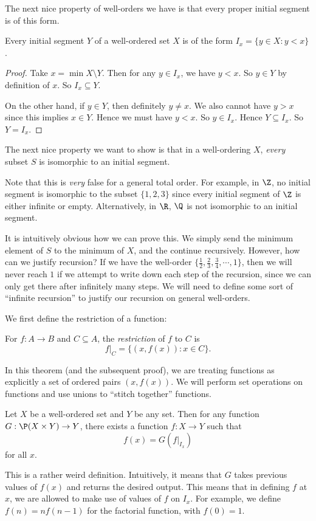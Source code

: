 \documentclass[a4paper]{article}
\begin{document}
The next nice property of well-orders we have is that every proper initial segment is of this form.
\begin{prop}
  Every initial segment $Y$ of a well-ordered set $X$ is of the form $I_x = \{y\in X: y < x\}$.
\end{prop}

\begin{proof}
  Take $x = \min X\setminus Y$. Then for any $y\in I_x$, we have $y < x$. So $y \in Y$ by definition of $x$. So $I_x \subseteq Y$.

  On the other hand, if $y \in Y$, then definitely $y \not= x$. We also cannot have $y > x$ since this implies $x \in Y$. Hence we must have $y < x$. So $y \in I_x$. Hence $Y \subseteq I_x$. So $Y = I_x$.
\end{proof}

The next nice property we want to show is that in a well-ordering $X$, \emph{every} subset $S$ is isomorphic to an initial segment.

Note that this is \emph{very} false for a general total order. For example, in $\Z$, no initial segment is isomorphic to the subset $\{1, 2, 3\}$ since every initial segment of $\Z$ is either infinite or empty. Alternatively, in $\R$, $\Q$ is not isomorphic to an initial segment.

It is intuitively obvious how we can prove this. We simply send the minimum element of $S$ to the minimum of $X$, and the continue recursively. However, how can we justify recursion? If we have the well-order $\{\frac{1}{2}, \frac{2}{3}, \frac{3}{4}, \cdots, 1\}$, then we will never reach $1$ if we attempt to write down each step of the recursion, since we can only get there after infinitely many steps. We will need to define some sort of ``infinite recursion'' to justify our recursion on general well-orders.

We first define the restriction of a function:
\begin{defi}
  For $f: A\to B$ and $C\subseteq A$, the \emph{restriction} of $f$ to $C$ is
  \[
    f|_C = \{(x, f(x)): x\in C\}.
  \]
\end{defi}
In this theorem (and the subsequent proof), we are treating functions as explicitly a set of ordered pairs $(x, f(x))$. We will perform set operations on functions and use unions to ``stitch together'' functions.

\begin{thm}
  Let $X$ be a well-ordered set and $Y$ be any set. Then for any function $G: \P(X\times Y)\to Y$, there exists a function  $f:X\to Y$ such that
  \[
    f(x) = G(f|_{I_x})
  \]
  for all $x$.

  This is a rather weird definition. Intuitively, it means that $G$ takes previous values of $f(x)$ and returns the desired output. This means that in defining $f$ at $x$, we are allowed to make use of values of $f$ on $I_x$. For example, we define $f(n) = n f(n - 1)$ for the factorial function, with $f(0) = 1$.
\end{thm}
\end{document}
